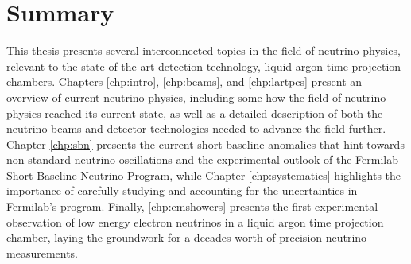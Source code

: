 \chapter{Summary}

This thesis presents several interconnected topics in the field of neutrino physics, relevant to the state of the art detection technology, liquid argon time projection chambers.  Chapters \ref{chp:intro}, \ref{chp:beams}, and \ref{chp:lartpcs} present an overview of current neutrino physics, including some how the field of neutrino physics reached its current state, as well as a detailed description of both the neutrino beams and detector technologies needed to advance the field further.  Chapter \ref{chp:sbn} presents the current short baseline anomalies that hint towards non standard neutrino oscillations and the experimental outlook of the Fermilab Short Baseline Neutrino Program, while Chapter \ref{chp:systematics} highlights the importance of carefully studying and accounting for the uncertainties in Fermilab's program.  Finally, \ref{chp:emshowers} presents the first experimental observation of low energy electron neutrinos in a liquid argon time projection chamber, laying the groundwork for a decades worth of precision neutrino measurements.